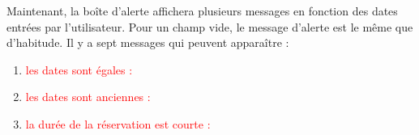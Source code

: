 \documentclass{article}
\begin{document}
\begin{enumerate}
  
  
  
  Maintenant, la boîte d'alerte affichera plusieurs messages en fonction des dates entrées par l'utilisateur. Pour un champ vide, le message d'alerte est le même que d'habitude. Il y a sept messages qui peuvent apparaître :
  
  \begin{enumerate}
 
 
  \item \textcolor{red}{les dates sont égales :} 
  \vspace{0.7cm}
               \hspace*{-0.7in}

               \noindent{}
  \item \textcolor{red}{les dates sont anciennes :} 
  \vspace{0.7cm}
               \hspace*{-0.7in}

               \noindent{}
  \item \textcolor{red}{la durée de la réservation est courte :} 
  \vspace{0.7cm}
               \hspace*{-0.7in}


\end{enumerate}
\end{enumerate}
\end{document}
